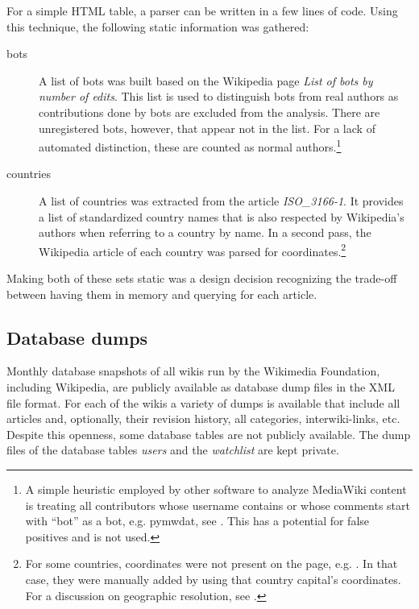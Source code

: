For a simple HTML table, a parser can be written in a few lines of code.
Using this technique, the following static information was gathered:

\begin{description}
\item[bots] A list of bots was built based on the Wikipedia page \emph{List of bots by number of edits}. 
This list is used to distinguish bots from real authors as contributions done by bots are excluded from the analysis.
There are unregistered bots, however, that appear not in the list.
For a lack of automated distinction, these are counted as normal authors.\footnote{A simple heuristic employed by other software to analyze MediaWiki content is treating all contributors whose username contains or whose comments start with ``bot'' as a bot, e.g. pymwdat, see . This has a potential for false positives and is not used.}
\item[countries] A list of countries was extracted from the article \emph{ISO\_3166-1}. 
It provides a list of standardized country names that is also respected by Wikipedia's authors when referring to a country by name.
In a second pass, the Wikipedia article of each country was parsed for coordinates.\footnote{For some countries, coordinates were not present on the page, e.g. . In that case, they were manually added by using that country capital's coordinates. For a discussion on geographic resolution, see .}
\end{description}

Making both of these sets static was a design decision recognizing the trade-off between having them in memory and querying for each article.

\subsection{Database dumps}\label{sub:dumps}

Monthly database snapshots of all wikis run by the Wikimedia Foundation, including Wikipedia,  are publicly available as database dump files in the XML file format.
For each of the wikis a variety of dumps is available that include all articles and, optionally, their revision history, all categories, interwiki-links, etc.
Despite this openness, some database tables are not publicly available.
The dump files of the database tables \emph{users} and the \emph{watchlist} are kept private.

